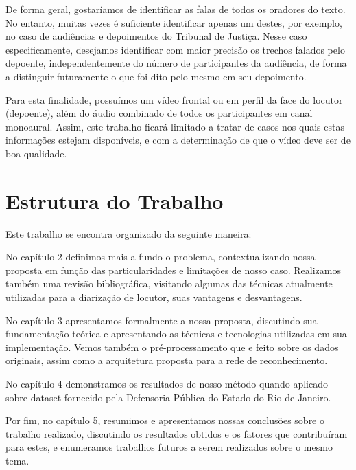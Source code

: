 De forma geral, gostaríamos de identificar as falas de todos os oradores do texto. No entanto, muitas vezes é suficiente identificar apenas um destes, por exemplo, no caso de audiências e depoimentos do Tribunal de Justiça. Nesse caso especificamente, desejamos identificar com maior precisão os trechos falados pelo depoente, independentemente do número de participantes da audiência, de forma a distinguir futuramente o que foi dito pelo mesmo em seu depoimento.

Para esta finalidade, possuímos um vídeo frontal ou em perfil da face do locutor (depoente), além do áudio combinado de todos os participantes em canal monoaural. Assim, este trabalho ficará limitado a tratar de casos nos quais estas informações estejam disponíveis, e com a determinação de que o vídeo deve ser de boa qualidade.

\section{Estrutura do Trabalho}

Este trabalho se encontra organizado da seguinte maneira:

No capítulo 2 definimos mais a fundo o problema, contextualizando nossa proposta em função das particularidades e limitações de nosso caso. Realizamos também uma revisão bibliográfica, visitando algumas das técnicas atualmente utilizadas para a diarização de locutor, suas vantagens e desvantagens.

No capítulo 3 apresentamos formalmente a nossa proposta, discutindo sua fundamentação teórica e apresentando as técnicas e tecnologias utilizadas em sua implementação. Vemos também o pré-processamento que e feito sobre os dados originais, assim como a arquitetura proposta para a rede de reconhecimento.

No capítulo 4 demonstramos os resultados de nosso método quando aplicado sobre dataset fornecido pela Defensoria Pública do Estado do Rio de Janeiro.

Por fim, no capítulo 5, resumimos e apresentamos nossas conclusões sobre o trabalho realizado, discutindo os resultados obtidos e os fatores que contribuíram para estes, e enumeramos trabalhos futuros a serem realizados sobre o mesmo tema.